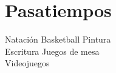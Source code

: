 \section{Pasatiempos \faGamepad}
Natación \textbullet{} Basketball \textbullet{} Pintura\\ 
Escritura \textbullet{} Juegos de mesa \\
Videojuegos
\sectionsep